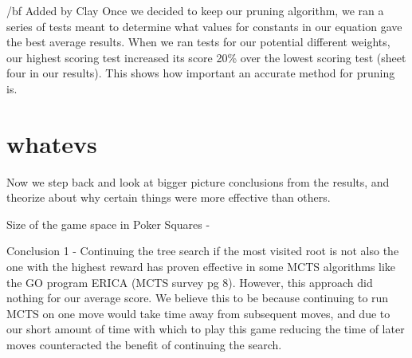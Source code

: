 \documentclass[letterpaper]{article}
\begin{document}
{/bf Added by Clay} Once we decided to keep our pruning algorithm, we ran a series of tests meant to determine what values for constants in our equation gave the best average results. When we ran tests for our potential different weights, our highest scoring test increased its score 20\% over the lowest scoring test (sheet four in our results). This shows how important an accurate method for pruning is. 


\section{whatevs}

Now we step back and look at bigger picture conclusions from the results, and theorize about why certain things were more effective than others.

Size of the game space in Poker Squares - 

Conclusion 1 - Continuing the tree search if the most visited root is not also the one with the highest reward has proven effective in some MCTS algorithms like the GO program ERICA (MCTS survey pg 8). However, this approach did nothing for our average score. We believe this to be because continuing to run MCTS on one move would take time away from subsequent moves, and due to our short amount of time with which to play this game reducing the time of later moves counteracted the benefit of continuing the search.
\end{document}
